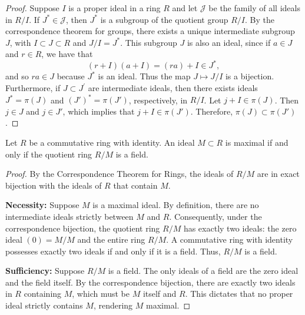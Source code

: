 \documentclass[11pt]{scrartcl}
\begin{document}
\begin{proof}
    Suppose $I$ is a proper ideal in a ring $R$ and let $\mathcal{J}$ be the family of all ideals in $R/I$. If $J^* \in \mathcal{J}$, then $J^*$ is a subgroup of the quotient group $R/I$. By the correspondence theorem for groups, there exists a unique intermediate subgroup $J$, with $I \subset J \subset R$ and $J/I = J^*$. This subgroup $J$ is also an ideal, since if $a \in J$ and $r \in R$, we have that $$(r + I)(a + I) = (ra) + I \in J^*,$$ and so $ra \in J$ because $J^*$ is an ideal. Thus the map $J \mapsto J/I$ is a bijection. Furthermore, if $J \subset J^'$ are intermediate ideals, then there exists ideals $J^*=\pi(J)$ and $(J')^* = \pi(J')$, respectively, in $R/I$. Let $j + I \in \pi(J)$. Then $j \in J$ and $j \in J'$, which implies that $j + I \in \pi(J')$. Therefore, $\pi(J) \subset \pi(J')$.
\end{proof}
\begin{theorem}
    Let $R$ be a commutative ring with identity. An ideal $M \subset R$ is maximal if and only if the quotient ring $R/M$ is a field.
\end{theorem}
\begin{proof}
    By the Correspondence Theorem for Rings, the ideals of $R/M$ are in exact bijection with the ideals of $R$ that contain $M$. 
    
    \textbf{Necessity:} Suppose $M$ is a maximal ideal. By definition, there are no intermediate ideals strictly between $M$ and $R$. Consequently, under the correspondence bijection, the quotient ring $R/M$ has exactly two ideals: the zero ideal $(0) = M/M$ and the entire ring $R/M$. A commutative ring with identity possesses exactly two ideals if and only if it is a field. Thus, $R/M$ is a field.
    
    \textbf{Sufficiency:} Suppose $R/M$ is a field. The only ideals of a field are the zero ideal and the field itself. By the correspondence bijection, there are exactly two ideals in $R$ containing $M$, which must be $M$ itself and $R$. This dictates that no proper ideal strictly contains $M$, rendering $M$ maximal.
\end{proof}
\end{document}
